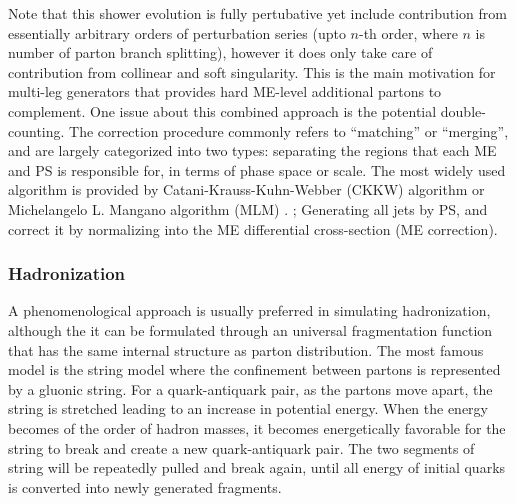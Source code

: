 Note that this shower evolution is fully pertubative yet include contribution from essentially arbitrary orders of perturbation series (upto $n$-th order, where $n$ is number of parton branch splitting), however it does only take care of contribution from collinear and soft singularity. This is the main motivation for multi-leg generators that provides hard ME-level additional partons to complement. One issue about this combined approach is the potential double-counting. The correction procedure commonly refers to ``matching'' or ``merging'', and are largely categorized into two types: separating the regions that each ME and PS is responsible for, in terms of phase space or scale. The most widely used algorithm is provided by Catani-Krauss-Kuhn-Webber (CKKW) \cite{CKKW_orig} algorithm or Michelangelo L. Mangano algorithm (MLM) \cite{MLM}. ; Generating all jets by PS, and correct it by normalizing into the ME differential cross-section (ME correction).
\\




\subsubsection{Hadronization}
A phenomenological approach is usually preferred in simulating hadronization, although the it can be formulated through an universal fragmentation function that has the same internal structure as parton distribution. 
The most famous model is the string model \cite{LundStringModel} where the confinement between partons is represented by a gluonic string. 
For a quark-antiquark pair, as the partons move apart, the string is stretched leading to an increase in potential energy. 
When the energy becomes of the order of hadron masses, it becomes energetically favorable for the string to break and create a new quark-antiquark pair. 
The two segments of string will be repeatedly pulled and break again, until all energy of initial quarks is converted into newly generated fragments.




